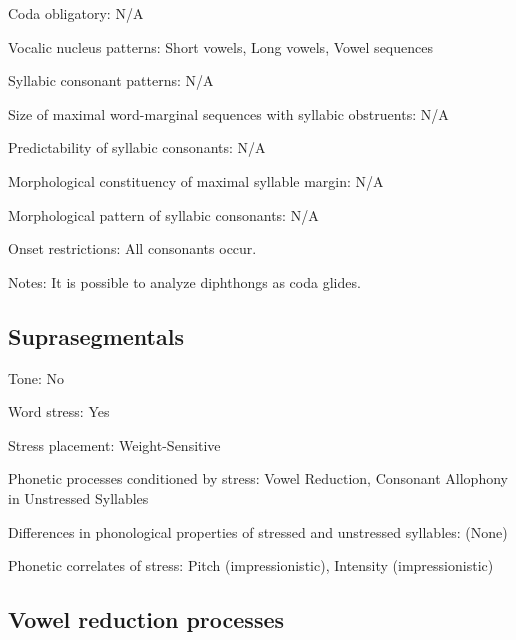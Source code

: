 {\begin{appendixdesc}
\item[Coda obligatory:] N/A

\item[Vocalic nucleus patterns:] Short vowels, Long vowels, Vowel sequences

\item[Syllabic consonant patterns:] N/A

\item[Size of maximal word-marginal sequences with syllabic obstruents:]  N/A

\item[Predictability of syllabic consonants:] N/A

\item[Morphological constituency of maximal syllable margin:] N/A

\item[Morphological pattern of syllabic consonants:] N/A

\item[Onset restrictions:] All consonants occur.

\item[Notes:] It is possible to analyze diphthongs as coda glides.
\end{appendixdesc}
\subsection*{Suprasegmentals}
\begin{appendixdesc}

\item[Tone:] No

\item[Word stress:] Yes

\item[Stress placement:] Weight-Sensitive

\item[Phonetic processes conditioned by stress:] Vowel Reduction, Consonant Allophony in Unstressed Syllables

\item[Differences in phonological properties of stressed and unstressed syllables:] (None)

\item[Phonetic correlates of stress:] Pitch (impressionistic), Intensity (impressionistic)
\end{appendixdesc}
\subsection*{Vowel reduction processes}
\begin{appendixdesc}


\end{appendixdesc}}
